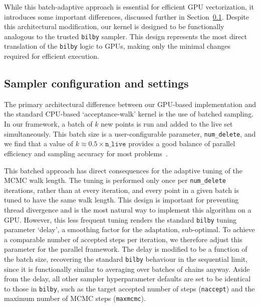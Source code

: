 \documentclass[fleqn,usenatbib]{mnras}
\begin{document}
While this batch-adaptive approach is essential for efficient GPU
vectorization, it introduces some important differences, discussed further in Section~\ref{sec:sampler_config}.
Despite this architectural modification, our kernel is designed to be functionally
analogous to the trusted \texttt{bilby} sampler. This design
represents the most direct translation of the \texttt{bilby} logic
to GPUs, making only the minimal changes required for efficient execution. 

\subsection{Sampler configuration and settings}
\label{sec:sampler_config}

The primary architectural difference between our GPU-based implementation
and the standard CPU-based `acceptance-walk' kernel is the use of
batched sampling. In our framework, a batch of $k$ new points is
run and added to the live set simultaneously. This batch size is
a user-configurable parameter, \texttt{num\_delete}, and we find that a
value of \mbox{$k \approx 0.5 \times \texttt{n\_live}$} provides a good balance
of parallel efficiency and sampling accuracy for most problems~\citep{yallup2025nested}.

This batched approach has direct consequences for the adaptive tuning of
the MCMC walk length. The tuning is performed only once per \texttt{num\_delete} iterations, 
rather than at every iteration, and every point in a given batch is tuned to have the same walk length.
This design is important for preventing thread divergence and is the 
most natural way to implement this algorithm on a GPU.
However, this less frequent tuning renders the standard \texttt{bilby}
tuning parameter `delay', a smoothing factor for
the adaptation, sub-optimal. 
To achieve a comparable number of accepted steps per
iteration, we therefore adjust this parameter for the parallel
framework. The delay is modified to be a function of the batch size,
recovering the standard \texttt{bilby} behaviour in the sequential
limit, since it is functionally similar to averaging over batches of chains
anyway. Aside from the delay, all other sampler hyperparameter defaults are 
set to be identical to those in \texttt{bilby}, such as the target accepted number of steps
(\texttt{naccept}) and the maximum number of MCMC steps (\texttt{maxmcmc}).
\end{document}
